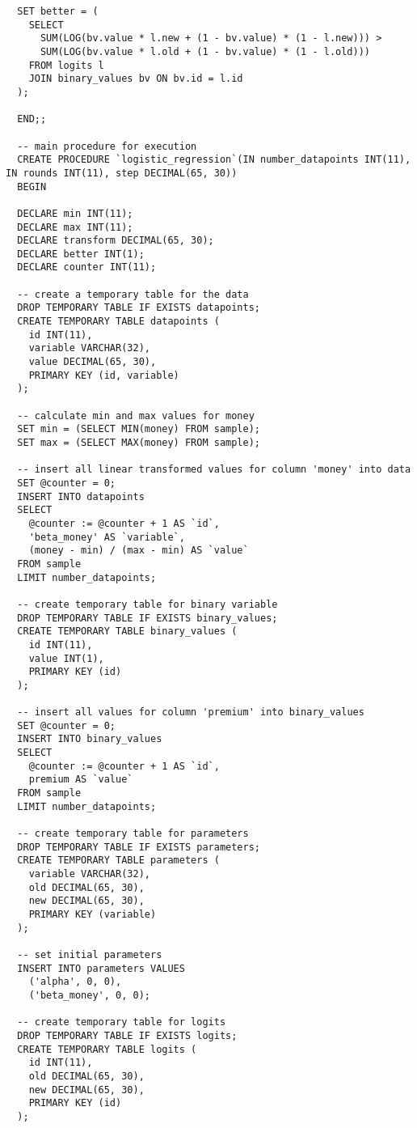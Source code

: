 \begin{verbatim}
  SET better = (
    SELECT
      SUM(LOG(bv.value * l.new + (1 - bv.value) * (1 - l.new))) >
      SUM(LOG(bv.value * l.old + (1 - bv.value) * (1 - l.old)))
    FROM logits l
    JOIN binary_values bv ON bv.id = l.id
  );

  END;;

  -- main procedure for execution
  CREATE PROCEDURE `logistic_regression`(IN number_datapoints INT(11), IN rounds INT(11), step DECIMAL(65, 30))
  BEGIN

  DECLARE min INT(11);
  DECLARE max INT(11);
  DECLARE transform DECIMAL(65, 30);
  DECLARE better INT(1);
  DECLARE counter INT(11);

  -- create a temporary table for the data
  DROP TEMPORARY TABLE IF EXISTS datapoints;
  CREATE TEMPORARY TABLE datapoints (
    id INT(11),
    variable VARCHAR(32),
    value DECIMAL(65, 30),
    PRIMARY KEY (id, variable)
  );

  -- calculate min and max values for money
  SET min = (SELECT MIN(money) FROM sample);
  SET max = (SELECT MAX(money) FROM sample);

  -- insert all linear transformed values for column 'money' into data
  SET @counter = 0;
  INSERT INTO datapoints
  SELECT
    @counter := @counter + 1 AS `id`,
    'beta_money' AS `variable`,
    (money - min) / (max - min) AS `value`
  FROM sample
  LIMIT number_datapoints;

  -- create temporary table for binary variable
  DROP TEMPORARY TABLE IF EXISTS binary_values;
  CREATE TEMPORARY TABLE binary_values (
    id INT(11),
    value INT(1),
    PRIMARY KEY (id)
  );

  -- insert all values for column 'premium' into binary_values
  SET @counter = 0;
  INSERT INTO binary_values
  SELECT
    @counter := @counter + 1 AS `id`,
    premium AS `value`
  FROM sample
  LIMIT number_datapoints;

  -- create temporary table for parameters
  DROP TEMPORARY TABLE IF EXISTS parameters;
  CREATE TEMPORARY TABLE parameters (
    variable VARCHAR(32),
    old DECIMAL(65, 30),
    new DECIMAL(65, 30),
    PRIMARY KEY (variable)
  );

  -- set initial parameters
  INSERT INTO parameters VALUES
    ('alpha', 0, 0),
    ('beta_money', 0, 0);

  -- create temporary table for logits
  DROP TEMPORARY TABLE IF EXISTS logits;
  CREATE TEMPORARY TABLE logits (
    id INT(11),
    old DECIMAL(65, 30),
    new DECIMAL(65, 30),
    PRIMARY KEY (id)
  );


\end{verbatim}
